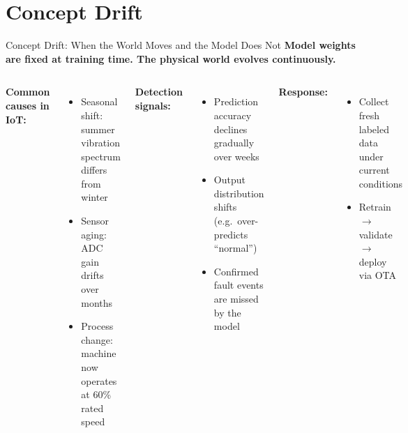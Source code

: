 \documentclass[aspectratio=169,11pt]{beamer}
\begin{document}
\section{Concept Drift}

\begin{frame}{Concept Drift: When the World Moves and the Model Does Not}
    \small
    \textbf{Model weights are fixed at training time. The physical world evolves continuously.}

    \vspace{0.25cm}
    \begin{columns}
        \textbf{Common causes in IoT:}
        \begin{itemize}\setlength{\itemsep}{8pt}
            \item Seasonal shift: summer vibration spectrum differs from winter
            \item Sensor aging: ADC gain drifts over months
            \item Process change: machine now operates at 60\% rated speed
        \end{itemize}

        \textbf{Detection signals:}
        \begin{itemize}\setlength{\itemsep}{8pt}
            \item Prediction accuracy declines gradually over weeks
            \item Output distribution shifts (e.g.\ over-predicts ``normal'')
            \item Confirmed fault events are missed by the model
        \end{itemize}

        \vspace{0.2cm}
        \textbf{Response:}
        \begin{itemize}\setlength{\itemsep}{8pt}
            \item Collect fresh labeled data under current conditions
            \item Retrain $\rightarrow$ validate $\rightarrow$ deploy via OTA
        \end{itemize}
    \end{columns}
\end{frame}
\end{document}
